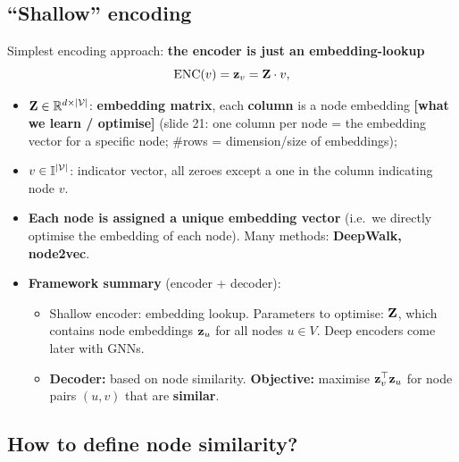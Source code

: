 \subsection{``Shallow'' encoding}\label{sec:lec02-shallow}

\begin{definition}\label{def:lec02-shallow}
  Simplest encoding approach: \textbf{the encoder is just an embedding-lookup}
  \begin{equation}\label{eq:lec02-lookup}
    \operatorname{ENC}(v)=\mathbf{z}_v=\mathbf{Z}\cdot v,
  \end{equation}
  \begin{itemize}
    \item $\mathbf{Z}\in\mathbb{R}^{d\times|\mathcal{V}|}$: \textbf{embedding matrix}, each
      \textbf{column} is a node embedding \textbf{[what we learn / optimise]}
      (slide 21: one column per node = the embedding vector for a specific node;
      \#rows = dimension/size of embeddings);
    \item $v\in\mathbb{I}^{|\mathcal{V}|}$: indicator vector, all zeroes except a one in
      the column indicating node $v$.
  \end{itemize}
\end{definition}
\begin{itemize}
  \item \textbf{Each node is assigned a unique embedding vector} (i.e.\ we
    directly optimise the embedding of each node). Many methods: \textbf{DeepWalk,
    node2vec}.
  \item \textbf{Framework summary} (encoder + decoder):
    \begin{itemize}
      \item Shallow encoder: embedding lookup. Parameters to optimise: $\mathbf{Z}$,
        which contains node embeddings $\mathbf{z}_u$ for all nodes $u\in V$. Deep
        encoders come later with GNNs.
      \item \textbf{Decoder:} based on node similarity.
        \textbf{Objective:} maximise $\mathbf{z}_v^{\top}\mathbf{z}_u$ for node pairs $(u,v)$ that
        are \textbf{similar}.
    \end{itemize}
\end{itemize}

\subsection{How to define node similarity?}\label{sec:lec02-similarity}


